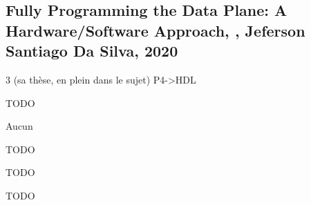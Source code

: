
\subsection{Fully Programming the Data Plane: A Hardware/Software Approach, \cite{santiago_da_silva_fully_2020}, Jeferson Santiago Da Silva, 2020}
 3 (sa thèse, en plein dans le sujet)
 P4->HDL

 TODO

 Aucun

 TODO

 TODO

 TODO

\clearpage
